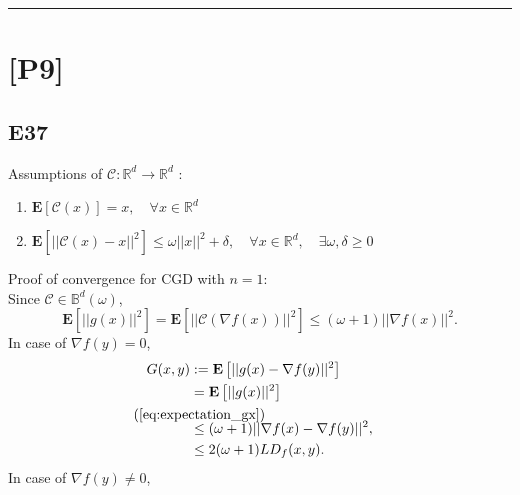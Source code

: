 \documentclass[12pt]{article}
\newcommand{\defeq}[2]{\stackrel{\mathclap{\normalfont\mbox{#1}}}{#2}}
\begin{document}
\hrule
\vspace{0.1cm}
\section*{[P9]}
\subsection*{E37}
Assumptions of $\mathcal{C}:\mathbb{R}^d \rightarrow \mathbb{R}^d$ :
\begin{enumerate}
    \item $\mathbf{E}[\mathcal{C}(x)] = x, \quad \forall x \in \mathbb{R}^d$
    \item $\mathbf{E}\left[||\mathcal{C}(x) - x||^2\right] \leq \omega ||x ||^2 + \delta, \quad \forall x \in \mathbb{R}^d, \quad \exists \omega, \delta \geq 0$
\end{enumerate}
Proof of convergence for CGD with $n=1$: \\
Since $\mathcal{C} \in \mathbb{B}^d(\omega)$,
\vspace{0.2cm}
\begin{equation}
    \mathbf{E}\left[ ||g(x)||^2 \right] = \mathbf{E}\left[||\mathcal{C}(\nabla f(x)) ||^2\right] \leq (\omega + 1) || \nabla f(x)||^2.
    \label{eq:expectation_gx}
\end{equation}
In case of $\nabla f(y) = 0$,
\begin{equation*}
    \begin{split}
        G(x,y) &:= \mathbf{E}\left[ ||g(x) - \nabla f(y)||^2 \right] \\
            &= \mathbf{E}\left[ ||g(x)||^2 \right] \\
            &\defeq{(\ref{eq:expectation_gx})}{\leq} (\omega + 1)||\nabla f(x) - \nabla f(y)||^2, \\
            &\leq 2(\omega + 1)LD_f(x,y).
    \end{split}
\end{equation*}
In case of $\nabla f(y) \neq 0$,
\end{document}
